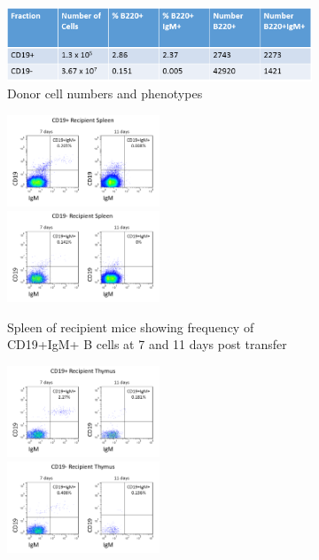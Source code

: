 \begin{figure}
	\begin{subfigure}{\textwidth}
	\includegraphics[width=\textwidth]{Figures/WTdonortable.png}
	\caption{Donor cell numbers and phenotypes}
	\label{subfig:WTdonortable}
	\end{subfigure}
	\begin{subfigure}{\textwidth}
	\includegraphics[width=0.5\textwidth]{Figures/CD19posrecipspleen.png}
	\includegraphics[width=0.5\textwidth]{Figures/CD19negrecipspleen.png}
	\caption{Spleen of recipient mice showing frequency of CD19+IgM+ B cells at 7 and 11 days post transfer}
	\end{subfigure}
	\begin{subfigure}{\textwidth}
	\includegraphics[width=0.5\textwidth]{Figures/CD19posrecipthy.png}
	\includegraphics[width=0.5\textwidth]{Figures/CD19negrecipthy.png}

\end{subfigure}
\end{figure}
